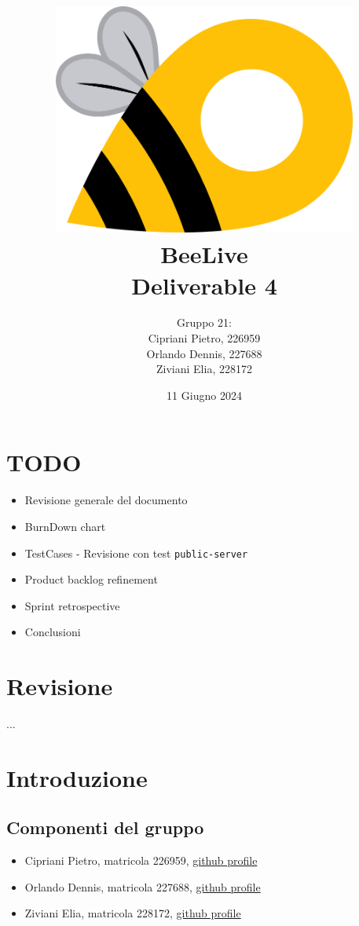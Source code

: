 \documentclass{article}
\title{\includegraphics[width=0.75\textwidth]{Images/BeeLive-Logo.png}\\\vspace{100pt}
\LARGE{\textbf{BeeLive\\Deliverable 4}}}
\author{Gruppo 21:\\
Cipriani Pietro, 226959\\
Orlando Dennis, 227688\\
Ziviani Elia, 228172}
\date{11 Giugno 2024}
\begin{document}
\maketitle
\thispagestyle{firstpage} %
\clearpage

\pagestyle{nonplain} %

\renewcommand{\contentsname}{Indice}
\tableofcontents

\clearpage

\section{TODO}
\begin{itemize}
    \item Revisione generale del documento
    \item BurnDown chart
    \item TestCases - Revisione con test \texttt{public-server}
    \item Product backlog refinement
    \item Sprint retrospective
    \item Conclusioni
\end{itemize}

\clearpage

\section{Revisione}
...

\clearpage

\section{Introduzione}

\subsection{Componenti del gruppo}
\begin{itemize}
    \item Cipriani Pietro, matricola 226959, \lbrack\href{https://github.com/pietrocipriani}{github profile}\rbrack
    \item Orlando Dennis, matricola 227688, \lbrack\href{https://github.com/dennisorlando}{github profile}\rbrack
    \item Ziviani Elia, matricola 228172, \lbrack\href{https://github.com/ELI20ZIVI}{github profile}\rbrack
\end{itemize}
\end{document}
